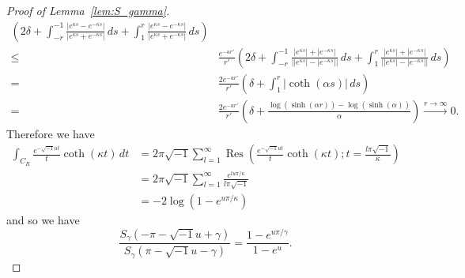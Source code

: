 \documentclass[a4paper]{amsart}
\theoremstyle{plain}
\theoremstyle{definition}
\theoremstyle{remark}
\newcommand{\Res}{\operatorname{Res}}
\numberwithin{equation}{section}
\begin{document}
\begin{proof}[Proof of Lemma~\ref{lem:S_gamma}]
\begin{equation*}
\begin{split}
  \left(
    2\delta
    +
    \int_{-r}^{-1}
    \frac{|e^{\kappa s}-e^{-\kappa s}|}{|e^{\kappa s}+e^{-\kappa s}|}
    \,ds
    +
    \int_{1}^{r}
    \frac{|e^{\kappa s}-e^{-\kappa s}|}{|e^{\kappa s}+e^{-\kappa s}|}
    \,ds
  \right)
  \\
  \le&
  \frac{e^{-ur'}}{r'}
  \left(
    2\delta
    +
    \int_{-r}^{-1}
    \frac{|e^{\kappa s}|+|e^{-\kappa s}|}
         {\bigl||e^{\kappa s}|-|e^{-\kappa s}|\bigr|}
    \,ds
    +
    \int_{1}^{r}
    \frac{|e^{\kappa s}|+|e^{-\kappa s}|}
         {\bigl||e^{\kappa s}|-|e^{-\kappa s}|\bigr|}
    \,ds
  \right)
  \\
  =&
  \frac{2e^{-ur'}}{r'}
  \left(
    \delta
    +
    \int_{1}^{r}|\coth(\alpha s)|\,ds
  \right)
  \\
  =&
  \frac{2e^{-ur'}}{r'}
  \left(
    \delta
    +
    \frac{\log(\sinh(\alpha r))-\log(\sinh(\alpha))}{\alpha}
  \right)
  \xrightarrow{r\to\infty}0.
\end{split}
\end{equation*}
Therefore we have
\begin{equation*}
\begin{split}
  \int_{C_R}\frac{e^{-\sqrt{-1}ut}}{t}\coth(\kappa t)\,dt
  &=
  2\pi\sqrt{-1}
  \sum_{l=1}^{\infty}
  \Res
  \left(
    \frac{e^{-\sqrt{-1}ut}}{t}\coth(\kappa t);
    t=\frac{l\pi\sqrt{-1}}{\kappa}
  \right)
  \\
  &=
  2\pi\sqrt{-1}
  \sum_{l=1}^{\infty}
  \frac{e^{lu\pi/\kappa}}{l\pi\sqrt{-1}}
  \\
  &=
  -2\log(1-e^{u\pi/\kappa})
\end{split}
\end{equation*}
and so we have
\begin{equation*}
  \frac{S_{\gamma}(-\pi-\sqrt{-1}u+\gamma)}{S_{\gamma}(\pi-\sqrt{-1}u-\gamma)}
  =
  \frac{1-e^{u\pi/\gamma}}{1-e^u}.
\end{equation*}
\end{proof}
\end{document}
